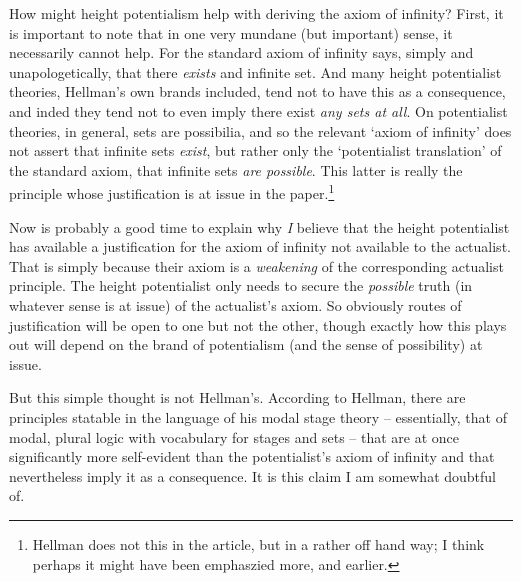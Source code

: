 \documentclass{article}
\theoremstyle{definition}
\begin{document}
How might height potentialism help with deriving the axiom of infinity? 
First, it is important to note that in one very mundane (but important) sense,
it necessarily cannot help. For the standard axiom of infinity says, 
simply and unapologetically, 
that there \emph{exists} and infinite set. And many height potentialist theories, 
Hellman's own brands included, 
tend not to have this as a consequence, and inded they tend not 
to even imply there exist \emph{any sets at all}. 
On potentialist theories, in general, sets are possibilia, 
and so the relevant `axiom of infinity' does not assert that 
infinite sets \emph{exist}, but rather 
only the `potentialist translation' of the standard axiom, 
that infinite sets \emph{are possible}. 
This latter is really the principle 
whose justification is at issue in the paper.\footnote{ 
    Hellman does not this in the article, but in a rather off hand way;
    I think perhaps it might have been emphaszied more, and earlier.
    }

Now is probably a good time to explain why 
\emph{I} 
believe that the height potentialist 
has available a justification for the axiom of infinity 
not available to the actualist. 
That is simply because their axiom is a 
\emph{ weakening } 
of the corresponding actualist principle. 
The height potentialist only needs to secure the 
\emph{possible} 
truth 
(in whatever sense is at issue) 
of the actualist's axiom. So obviously routes of justification 
will be open to one but not the other, though exactly how this plays out 
will depend on the brand of potentialism (and the sense of possibility) at issue.

But this simple thought is not Hellman's. 
According to Hellman, 
there are principles statable in the language of his modal stage theory 
-- essentially, that of modal, plural logic with 
vocabulary for stages and sets --
that are at once significantly more self-evident
than the potentialist's axiom of infinity 
and that nevertheless imply it as a consequence. 
It is this claim I am somewhat doubtful of.
\end{document}
